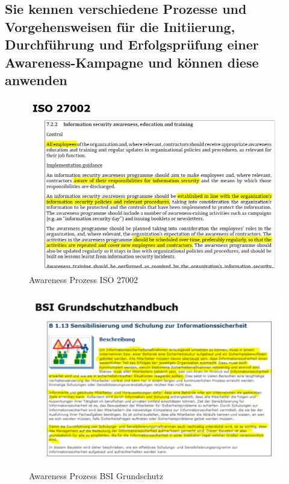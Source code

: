 \documentclass[10pt,a4paper]{article}
\begin{document}
\subsection*{Sie kennen verschiedene Prozesse und Vorgehensweisen für die Initiierung, Durchführung und Erfolgsprüfung einer Awareness-Kampagne und können diese anwenden}

\paragraph*{}
\begin{figure}[H]
    \begin{center}
    \includegraphics[width=15cm]{images/Awareness_Prozess_ISO.png}
    \caption{Awareness Prozess ISO 27002}
    \label{Awareness Prozess ISO 27002}
    \end{center}
\end{figure}

\paragraph*{}
\begin{figure}[H]
    \begin{center}
    \includegraphics[width=15cm]{images/Awareness_Prozess_BSI.png}
    \caption{Awareness Prozess BSI Grundschutz}
    \label{Awareness Prozess BSI Grundschutz}
    \end{center}
\end{figure}
\end{document}
